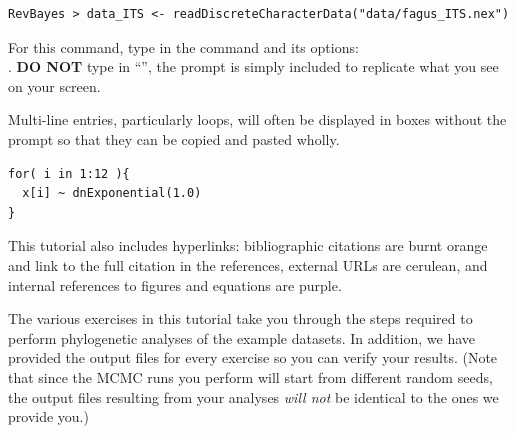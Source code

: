 {\tt \begin{snugshade*}
\begin{lstlisting}
RevBayes > data_ITS <- readDiscreteCharacterData("data/fagus_ITS.nex")
\end{lstlisting}
\end{snugshade*}}

For this command, type in the command and its options:\\ . 
\textbf{DO NOT} type in ``'', the prompt is simply included to replicate what you see on your screen. 

Multi-line entries, particularly loops, will often be displayed in boxes without the  prompt so that they can be copied and pasted wholly. 
{\tt \begin{snugshade*}
\begin{lstlisting}
for( i in 1:12 ){
  x[i] ~ dnExponential(1.0)
}
\end{lstlisting}
\end{snugshade*}}


This tutorial also includes hyperlinks: bibliographic citations are {\textcolor{citescol}{burnt orange}} and link to the full citation in the references, external URLs are {\textcolor{urlscol}{cerulean}}, and internal references to figures and equations are {\textcolor{linkscol}{purple}}.

The various exercises in this tutorial take you through the steps required to perform phylogenetic analyses of the example datasets. 
In addition, we have provided the output files for every exercise so you can verify your results. (Note that since the MCMC runs you perform will start from different random seeds, the output files resulting from your analyses \textit{will not} be identical to the ones we provide you.)





